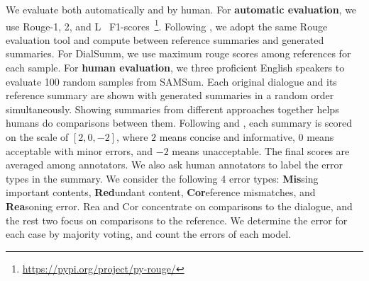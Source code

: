 We evaluate both automatically and by human.
For \textbf{automatic evaluation}, we use Rouge-1, 2, and L~\cite{lin2004rouge} 
F1-scores~\footnote{\url{https://pypi.org/project/py-rouge/}}. 
Following \citet{feng-etal-2021-language}, we adopt the same Rouge evaluation tool and compute between reference summaries and generated summaries. For DialSumm, we use maximum rouge scores among references for each sample.
For \textbf{human evaluation}, we three proficient English speakers to evaluate 100 
random samples from SAMSum.  
Each original dialogue and its reference summary are shown with generated summaries in a random order simultaneously. Showing summaries from different approaches together helps humans do comparisons between them.
Following \citet{chen2020multi} and \citet{liu2021coreference}, 
each summary is scored on the scale of $[2, 0, -2]$, where $2$ means concise 
and informative, $0$ means acceptable with minor errors, and $-2$ means 
unacceptable. The final scores are averaged among annotators.
We also ask human annotators to label the error types in the summary. 
We consider the following 4 error types:
\textbf{Mis}sing important contents, 
\textbf{Red}undant content, 
\textbf{Cor}eference mismatches, and
\textbf{Rea}soning error.
Rea and Cor concentrate on comparisons to the dialogue, 
and the rest two focus on comparisons to the reference. 
We determine the error for each case by majority voting, and count the errors of each model.

%
%

